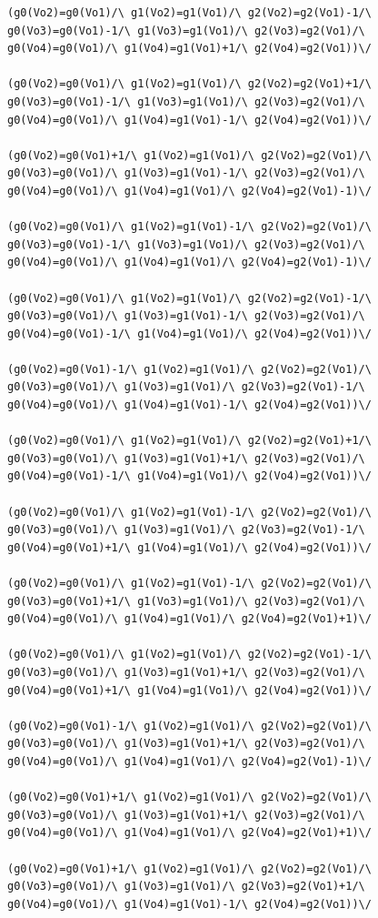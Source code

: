 \begin{appendices}
\begin{lstlisting}
(g0(Vo2)=g0(Vo1)/\ g1(Vo2)=g1(Vo1)/\ g2(Vo2)=g2(Vo1)-1/\ g0(Vo3)=g0(Vo1)-1/\ g1(Vo3)=g1(Vo1)/\ g2(Vo3)=g2(Vo1)/\ g0(Vo4)=g0(Vo1)/\ g1(Vo4)=g1(Vo1)+1/\ g2(Vo4)=g2(Vo1))\/ 

(g0(Vo2)=g0(Vo1)/\ g1(Vo2)=g1(Vo1)/\ g2(Vo2)=g2(Vo1)+1/\ g0(Vo3)=g0(Vo1)-1/\ g1(Vo3)=g1(Vo1)/\ g2(Vo3)=g2(Vo1)/\ g0(Vo4)=g0(Vo1)/\ g1(Vo4)=g1(Vo1)-1/\ g2(Vo4)=g2(Vo1))\/ 

(g0(Vo2)=g0(Vo1)+1/\ g1(Vo2)=g1(Vo1)/\ g2(Vo2)=g2(Vo1)/\ g0(Vo3)=g0(Vo1)/\ g1(Vo3)=g1(Vo1)-1/\ g2(Vo3)=g2(Vo1)/\ g0(Vo4)=g0(Vo1)/\ g1(Vo4)=g1(Vo1)/\ g2(Vo4)=g2(Vo1)-1)\/ 

(g0(Vo2)=g0(Vo1)/\ g1(Vo2)=g1(Vo1)-1/\ g2(Vo2)=g2(Vo1)/\ g0(Vo3)=g0(Vo1)-1/\ g1(Vo3)=g1(Vo1)/\ g2(Vo3)=g2(Vo1)/\ g0(Vo4)=g0(Vo1)/\ g1(Vo4)=g1(Vo1)/\ g2(Vo4)=g2(Vo1)-1)\/ 

(g0(Vo2)=g0(Vo1)/\ g1(Vo2)=g1(Vo1)/\ g2(Vo2)=g2(Vo1)-1/\ g0(Vo3)=g0(Vo1)/\ g1(Vo3)=g1(Vo1)-1/\ g2(Vo3)=g2(Vo1)/\ g0(Vo4)=g0(Vo1)-1/\ g1(Vo4)=g1(Vo1)/\ g2(Vo4)=g2(Vo1))\/ 

(g0(Vo2)=g0(Vo1)-1/\ g1(Vo2)=g1(Vo1)/\ g2(Vo2)=g2(Vo1)/\ g0(Vo3)=g0(Vo1)/\ g1(Vo3)=g1(Vo1)/\ g2(Vo3)=g2(Vo1)-1/\ g0(Vo4)=g0(Vo1)/\ g1(Vo4)=g1(Vo1)-1/\ g2(Vo4)=g2(Vo1))\/ 

(g0(Vo2)=g0(Vo1)/\ g1(Vo2)=g1(Vo1)/\ g2(Vo2)=g2(Vo1)+1/\ g0(Vo3)=g0(Vo1)/\ g1(Vo3)=g1(Vo1)+1/\ g2(Vo3)=g2(Vo1)/\ g0(Vo4)=g0(Vo1)-1/\ g1(Vo4)=g1(Vo1)/\ g2(Vo4)=g2(Vo1))\/ 

(g0(Vo2)=g0(Vo1)/\ g1(Vo2)=g1(Vo1)-1/\ g2(Vo2)=g2(Vo1)/\ g0(Vo3)=g0(Vo1)/\ g1(Vo3)=g1(Vo1)/\ g2(Vo3)=g2(Vo1)-1/\ g0(Vo4)=g0(Vo1)+1/\ g1(Vo4)=g1(Vo1)/\ g2(Vo4)=g2(Vo1))\/ 

(g0(Vo2)=g0(Vo1)/\ g1(Vo2)=g1(Vo1)-1/\ g2(Vo2)=g2(Vo1)/\ g0(Vo3)=g0(Vo1)+1/\ g1(Vo3)=g1(Vo1)/\ g2(Vo3)=g2(Vo1)/\ g0(Vo4)=g0(Vo1)/\ g1(Vo4)=g1(Vo1)/\ g2(Vo4)=g2(Vo1)+1)\/ 

(g0(Vo2)=g0(Vo1)/\ g1(Vo2)=g1(Vo1)/\ g2(Vo2)=g2(Vo1)-1/\ g0(Vo3)=g0(Vo1)/\ g1(Vo3)=g1(Vo1)+1/\ g2(Vo3)=g2(Vo1)/\ g0(Vo4)=g0(Vo1)+1/\ g1(Vo4)=g1(Vo1)/\ g2(Vo4)=g2(Vo1))\/ 

(g0(Vo2)=g0(Vo1)-1/\ g1(Vo2)=g1(Vo1)/\ g2(Vo2)=g2(Vo1)/\ g0(Vo3)=g0(Vo1)/\ g1(Vo3)=g1(Vo1)+1/\ g2(Vo3)=g2(Vo1)/\ g0(Vo4)=g0(Vo1)/\ g1(Vo4)=g1(Vo1)/\ g2(Vo4)=g2(Vo1)-1)\/ 

(g0(Vo2)=g0(Vo1)+1/\ g1(Vo2)=g1(Vo1)/\ g2(Vo2)=g2(Vo1)/\ g0(Vo3)=g0(Vo1)/\ g1(Vo3)=g1(Vo1)+1/\ g2(Vo3)=g2(Vo1)/\ g0(Vo4)=g0(Vo1)/\ g1(Vo4)=g1(Vo1)/\ g2(Vo4)=g2(Vo1)+1)\/ 

(g0(Vo2)=g0(Vo1)+1/\ g1(Vo2)=g1(Vo1)/\ g2(Vo2)=g2(Vo1)/\ g0(Vo3)=g0(Vo1)/\ g1(Vo3)=g1(Vo1)/\ g2(Vo3)=g2(Vo1)+1/\ g0(Vo4)=g0(Vo1)/\ g1(Vo4)=g1(Vo1)-1/\ g2(Vo4)=g2(Vo1))\/ 


\end{lstlisting}
\end{appendices}
